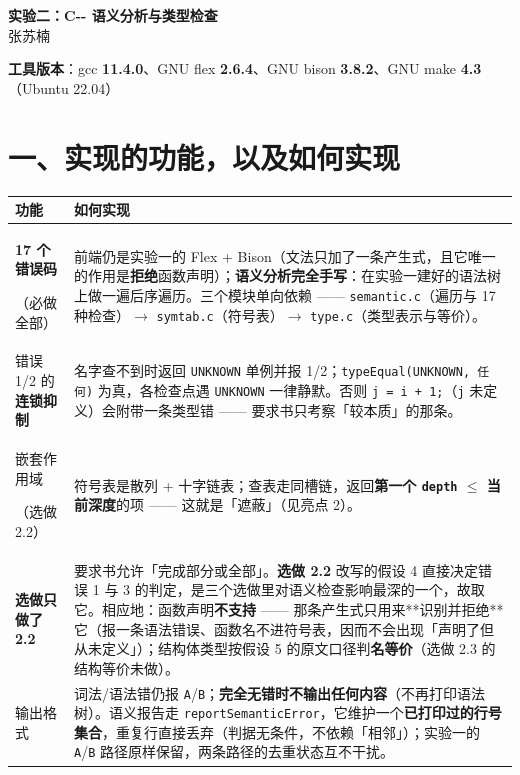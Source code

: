 \documentclass[11pt,a4paper]{ctexart}
\newcommand{\code}[1]{\texttt{#1}}
\begin{document}
\begin{center}
{\large\bfseries 实验二：C{-}{-} 语义分析与类型检查}\\[3pt]
张苏楠
\end{center}

\textbf{工具版本}：gcc \textbf{11.4.0}、GNU flex \textbf{2.6.4}、GNU bison
\textbf{3.8.2}、GNU make \textbf{4.3}（Ubuntu 22.04）

\section*{一、实现的功能，以及如何实现}

{\normalsize
\setlength{\parindent}{0pt}
\begin{tabular}{@{}>{\raggedright\arraybackslash}m{2.9cm}m{13.1cm}@{}}
\hline
\textbf{功能} & \textbf{如何实现} \\
\hline
\textbf{17 个错误码}\par（必做全部） & 前端仍是实验一的 Flex + Bison（文法只加了一条产生式，且它唯一的作用是\textbf{拒绝}函数声明）；\textbf{语义分析完全手写}：在实验一建好的语法树上做一遍后序遍历。三个模块单向依赖 —— \code{semantic.c}（遍历与 17 种检查）$\to$ \code{symtab.c}（符号表）$\to$ \code{type.c}（类型表示与等价）。\\
\hline
错误 1/2 的\textbf{连锁抑制} & 名字查不到时返回 \code{UNKNOWN} 单例并报 1/2；\code{typeEqual(UNKNOWN, 任何)} 为真，各检查点遇 \code{UNKNOWN} 一律静默。否则 \code{j = i + 1;}（\code{j} 未定义）会附带一条类型错 —— 要求书只考察「较本质」的那条。\\
\hline
嵌套作用域\par（选做 2.2） & 符号表是散列 + 十字链表；查表走同槽链，返回\textbf{第一个 \code{depth} $\le$ 当前深度}的项 —— 这就是「遮蔽」（见亮点 2）。\\
\hline
\textbf{选做只做了 2.2} & 要求书允许「完成部分或全部」。\textbf{选做 2.2} 改写的假设 4 直接决定错误 1 与 3 的判定，是三个选做里对语义检查影响最深的一个，故取它。相应地：函数声明\textbf{不支持} —— 那条产生式只用来**识别并拒绝**它（报一条语法错误、函数名不进符号表，因而不会出现「声明了但从未定义」）；结构体类型按假设 5 的原文口径判\textbf{名等价}（选做 2.3 的结构等价未做）。\\
\hline
输出格式 & 词法/语法错仍报 \code{A}/\code{B}；\textbf{完全无错时不输出任何内容}（不再打印语法树）。语义报告走 \code{reportSemanticError}，它维护一个\textbf{已打印过的行号集合}，重复行直接丢弃（判据无条件，不依赖「相邻」）；实验一的 \code{A}/\code{B} 路径原样保留，两条路径的去重状态互不干扰。\\
\hline
\end{tabular}}
\end{document}
